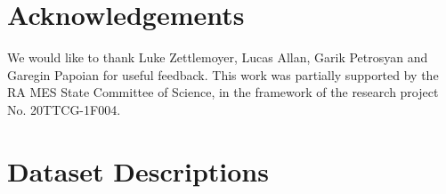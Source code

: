 \documentclass{article} %
\begin{document}
\section{Acknowledgements}
We would like to thank Luke Zettlemoyer, Lucas Allan, Garik Petrosyan and Garegin Papoian for useful feedback. 
This work was partially supported by the RA MES State Committee of Science, in the framework of the research project No. 20TTCG-1F004.


















\clearpage
\appendix
\section{Dataset Descriptions}
\end{document}

